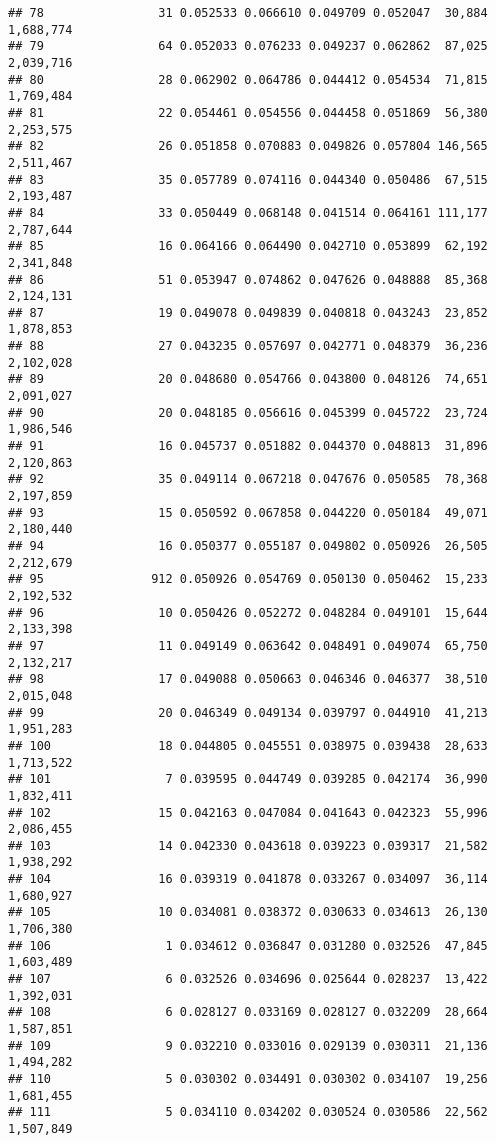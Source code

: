 \documentclass[]{article}
\begin{document}
\begin{verbatim}
## 78                31 0.052533 0.066610 0.049709 0.052047  30,884 1,688,774
## 79                64 0.052033 0.076233 0.049237 0.062862  87,025 2,039,716
## 80                28 0.062902 0.064786 0.044412 0.054534  71,815 1,769,484
## 81                22 0.054461 0.054556 0.044458 0.051869  56,380 2,253,575
## 82                26 0.051858 0.070883 0.049826 0.057804 146,565 2,511,467
## 83                35 0.057789 0.074116 0.044340 0.050486  67,515 2,193,487
## 84                33 0.050449 0.068148 0.041514 0.064161 111,177 2,787,644
## 85                16 0.064166 0.064490 0.042710 0.053899  62,192 2,341,848
## 86                51 0.053947 0.074862 0.047626 0.048888  85,368 2,124,131
## 87                19 0.049078 0.049839 0.040818 0.043243  23,852 1,878,853
## 88                27 0.043235 0.057697 0.042771 0.048379  36,236 2,102,028
## 89                20 0.048680 0.054766 0.043800 0.048126  74,651 2,091,027
## 90                20 0.048185 0.056616 0.045399 0.045722  23,724 1,986,546
## 91                16 0.045737 0.051882 0.044370 0.048813  31,896 2,120,863
## 92                35 0.049114 0.067218 0.047676 0.050585  78,368 2,197,859
## 93                15 0.050592 0.067858 0.044220 0.050184  49,071 2,180,440
## 94                16 0.050377 0.055187 0.049802 0.050926  26,505 2,212,679
## 95               912 0.050926 0.054769 0.050130 0.050462  15,233 2,192,532
## 96                10 0.050426 0.052272 0.048284 0.049101  15,644 2,133,398
## 97                11 0.049149 0.063642 0.048491 0.049074  65,750 2,132,217
## 98                17 0.049088 0.050663 0.046346 0.046377  38,510 2,015,048
## 99                20 0.046349 0.049134 0.039797 0.044910  41,213 1,951,283
## 100               18 0.044805 0.045551 0.038975 0.039438  28,633 1,713,522
## 101                7 0.039595 0.044749 0.039285 0.042174  36,990 1,832,411
## 102               15 0.042163 0.047084 0.041643 0.042323  55,996 2,086,455
## 103               14 0.042330 0.043618 0.039223 0.039317  21,582 1,938,292
## 104               16 0.039319 0.041878 0.033267 0.034097  36,114 1,680,927
## 105               10 0.034081 0.038372 0.030633 0.034613  26,130 1,706,380
## 106                1 0.034612 0.036847 0.031280 0.032526  47,845 1,603,489
## 107                6 0.032526 0.034696 0.025644 0.028237  13,422 1,392,031
## 108                6 0.028127 0.033169 0.028127 0.032209  28,664 1,587,851
## 109                9 0.032210 0.033016 0.029139 0.030311  21,136 1,494,282
## 110                5 0.030302 0.034491 0.030302 0.034107  19,256 1,681,455
## 111                5 0.034110 0.034202 0.030524 0.030586  22,562 1,507,849

\end{verbatim}
\end{document}
